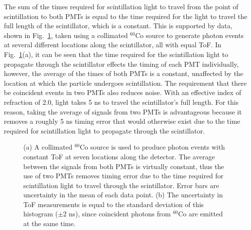The sum of the times required for scintillation light to travel from the point of scintillation to both PMTs is equal to the time required for the light to travel the full length of the scintillator, which is a constant.
This is supported by data, shown in Fig.~\ref{fig:ConstPMTAvg}, taken using a collimated $^{60}$Co source to generate photon events at several different locations along the scintillator, all with equal ToF.
In Fig.~\ref{fig:ConstPMTAvg}(a), it can be seen that the time required for the scintillation light to propagate through the scintillator effects the timing of each PMT individually, however, the average of the times of both PMTs is a constant, unaffected by the location at which the particle undergoes scintillation.
The requirement that there be coincident events in two PMTs also reduces noise.
With an effective index of refraction of 2.0, light takes 5 ns to travel the scintillator's full length.
For this reason, taking the average of signals from two PMTs is advantageous because it removes a roughly 5 ns timing error that would otherwise exist due to the time required for scintillation light to propagate through the scintillator.
\begin{figure}[h]
\centering
{}

\caption{(a) A collimated $^{60}$Co source is used to produce photon events with constant ToF at seven locations along the detector.
The average between the signals from both PMTs is virtually constant, thus the use of two PMTs removes timing error due to the time required for scintillation light to travel through the scintillator.
Error bars are uncertainty in the mean of each data point.
(b) The uncertainty in ToF measurements is equal to the standard deviation of this histogram ($\pm$2 ns), since coincident photons from $^{60}$Co are emitted at the same time.}
\label{fig:ConstPMTAvg}
\end{figure}


